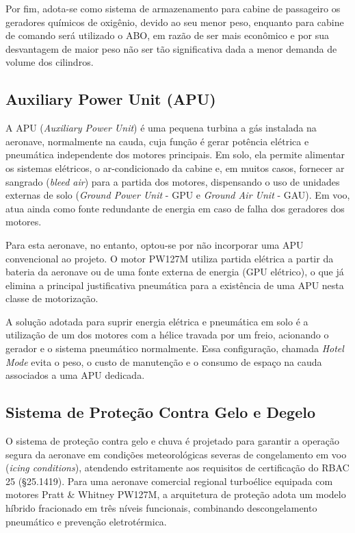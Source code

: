 Por fim, adota-se como sistema de armazenamento para cabine de passageiro os geradores químicos de oxigênio, devido ao seu menor peso, enquanto para cabine de comando será utilizado o ABO, em razão de ser mais econômico e por sua desvantagem de maior peso não ser tão significativa dada a menor demanda de volume dos cilindros.


\subsection{Auxiliary Power Unit (APU)}

A APU (\textit{Auxiliary Power Unit}) é uma pequena turbina a gás instalada na aeronave, normalmente na cauda, cuja função é gerar potência elétrica e pneumática independente dos motores principais. Em solo, ela permite alimentar os sistemas elétricos, o ar-condicionado da cabine e, em muitos casos, fornecer ar sangrado (\textit{bleed air}) para a partida dos motores, dispensando o uso de unidades externas de solo (\textit{Ground Power Unit} - GPU e \textit{Ground Air Unit} - GAU). Em voo, atua ainda como fonte redundante de energia em caso de falha dos geradores dos motores.

Para esta aeronave, no entanto, optou-se por não incorporar uma APU convencional ao projeto. O motor PW127M utiliza partida elétrica a partir da bateria da aeronave ou de uma fonte externa de energia (GPU elétrico), o que já elimina a principal justificativa pneumática para a existência de uma APU nesta classe de motorização.

 A solução adotada para suprir energia elétrica e pneumática em solo é a utilização de um dos motores com a hélice travada por um freio, acionando o gerador e o sistema pneumático normalmente. Essa configuração, chamada \textit{Hotel Mode} evita o peso, o custo de manutenção e o consumo de espaço na cauda associados a uma APU dedicada.

\subsection{Sistema de Proteção Contra Gelo e Degelo}
\label{subsec:degelo}

O sistema de proteção contra gelo e chuva é projetado para garantir a operação segura da aeronave em condições meteorológicas severas de congelamento em voo (\textit{icing conditions}), atendendo estritamente aos requisitos de certificação do RBAC 25 (§25.1419). Para uma aeronave comercial regional turboélice equipada com motores Pratt \& Whitney PW127M, a arquitetura de proteção adota um modelo híbrido fracionado em três níveis funcionais, combinando descongelamento pneumático e prevenção eletrotérmica.

